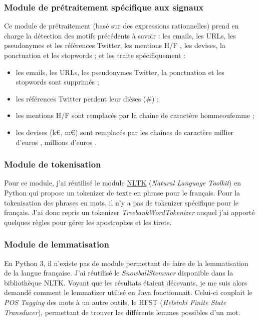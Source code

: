         \subsubsection{Module de prétraitement spécifique aux signaux}
            Ce module de prétraitement (basé sur des expressions rationnelles) prend en charge la détection des motifs précédents à savoir : les emails, les URLs, les pseudonymes et les références Twitter, les mentions \og H/F \fg, les devises, la ponctuation et les stopwords ; et les traite spécifiquement :
            \begin{itemize}
                \item les emails, les URLs, les pseudonymes Twitter, la ponctuation et les stopwords sont supprimés ;
                \item les références Twitter perdent leur dièses (\#) ;
                \item les mentions \og H/F \fg  sont remplacés par la chaîne de caractère \og hommeoufemme \fg ;
                \item les devises (k€, m€) sont remplacés par les chaînes de caractère \og millier d'euros \fg, \og millions d'euros \fg.
            \end{itemize}

        \subsubsection{Module de tokenisation}
            Pour ce module, j'ai réutilisé le module \href{http://www.nltk.org/}{NLTK} (\textit{Natural Language Toolkit}) en Python qui propose un tokenizer de texte en phrase pour le français. Pour la tokenisation des phrases en mots, il n'y a pas de tokenizer spécifique pour le français. J'ai donc repris un tokenizer \textit{TreebankWordTokenizer} auquel j'ai apporté quelques règles pour gérer les apostrophes et les tirets.

        \subsubsection{Module de lemmatisation}
            En Python 3, il n'existe pas de module permettant de faire de la lemmatisation de la langue française. J'ai réutilisé le \textit{SnowballStemmer} disponible dans la bibliothèque NLTK. Voyant que les résultats étaient décevants, je me suis alors demandé comment le lemmatizer utilisé en Java fonctionnait. Celui-ci couplait le \textit{POS Tagging} des mots à un autre outils, le HFST (\textit{Helsinki Finite State Transducer}), permettant de trouver les différents lemmes possibles d'un mot.\\

